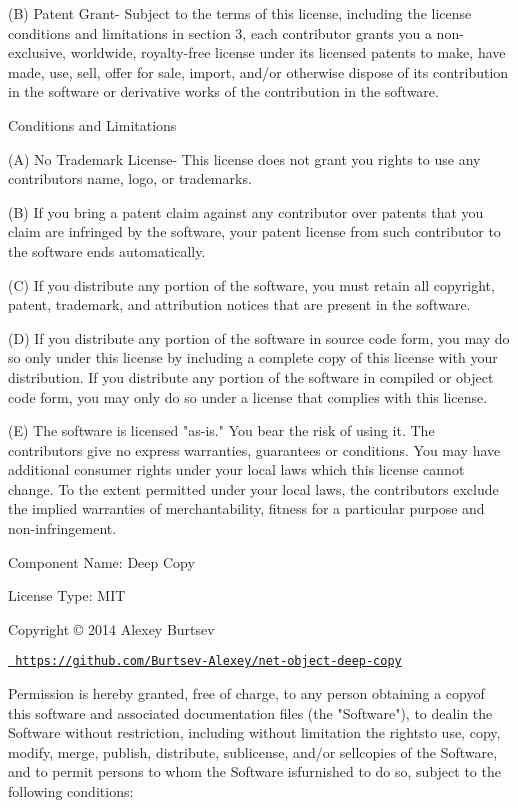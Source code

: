 (B) Patent Grant-\/ Subject to the terms of this license, including the license conditions and limitations in section 3, each contributor grants you a non-\/exclusive, worldwide, royalty-\/free license under its licensed patents to make, have made, use, sell, offer for sale, import, and/or otherwise dispose of its contribution in the software or derivative works of the contribution in the software.


\begin{DoxyEnumerate}
\item Conditions and Limitations
\end{DoxyEnumerate}

(A) No Trademark License-\/ This license does not grant you rights to use any contributors\textquotesingle{} name, logo, or trademarks.

(B) If you bring a patent claim against any contributor over patents that you claim are infringed by the software, your patent license from such contributor to the software ends automatically.

(C) If you distribute any portion of the software, you must retain all copyright, patent, trademark, and attribution notices that are present in the software.

(D) If you distribute any portion of the software in source code form, you may do so only under this license by including a complete copy of this license with your distribution. If you distribute any portion of the software in compiled or object code form, you may only do so under a license that complies with this license.

(E) The software is licensed "{}as-\/is."{} You bear the risk of using it. The contributors give no express warranties, guarantees or conditions. You may have additional consumer rights under your local laws which this license cannot change. To the extent permitted under your local laws, the contributors exclude the implied warranties of merchantability, fitness for a particular purpose and non-\/infringement.

 Component Name\+: Deep Copy

License Type\+: MIT

Copyright © 2014 Alexey Burtsev

\href{https://github.com/Burtsev-Alexey/net-object-deep-copy}{\texttt{ https\+://github.\+com/\+Burtsev-\/\+Alexey/net-\/object-\/deep-\/copy}}

Permission is hereby granted, free of charge, to any person obtaining a copyof this software and associated documentation files (the "{}\+Software"{}), to dealin the Software without restriction, including without limitation the rightsto use, copy, modify, merge, publish, distribute, sublicense, and/or sellcopies of the Software, and to permit persons to whom the Software isfurnished to do so, subject to the following conditions\+:

